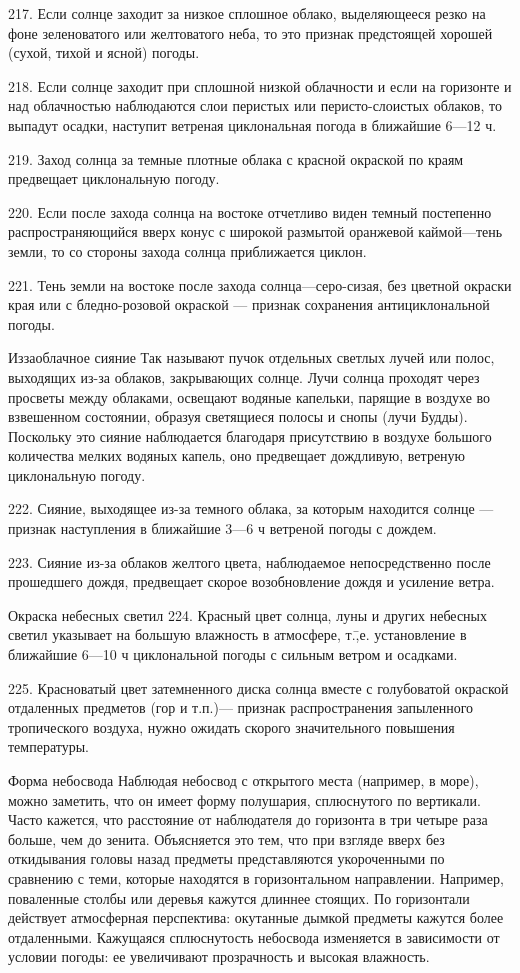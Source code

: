 217. Если солнце заходит за низкое сплошное облако, выделяющееся резко на фоне зеленоватого или желтоватого неба, то это признак предстоящей хорошей (сухой, тихой и ясной) погоды.

218. Если солнце заходит при сплошной низкой облачности и если на горизонте и над облачностью наблюдаются слои перистых или перисто-слоистых облаков, то выпадут осадки, наступит ветреная циклональная погода в ближайшие 6—12 ч.

219. Заход солнца за темные плотные облака с красной окраской по краям предвещает циклональную погоду.

220. Если после захода солнца на востоке отчетливо виден темный постепенно распространяющийся вверх конус с широкой размытой оранжевой каймой—тень земли, то со стороны захода солнца приближается циклон.

221. Тень земли на востоке после захода солнца—серо-сизая, без цветной окраски края или с бледно-розовой окраской — признак сохранения антициклональной погоды.

Иззаоблачное сияние
Так называют пучок отдельных светлых лучей или полос, выходящих из-за облаков, закрывающих солнце. Лучи солнца проходят через просветы между облаками, освещают водяные капельки, парящие в воздухе во взвешенном состоянии, образуя светящиеся полосы и снопы (лучи Будды). Поскольку это сияние наблюдается благодаря присутствию в воздухе большого количества мелких водяных капель, оно предвещает дождливую, ветреную циклональную погоду.

222. Сияние, выходящее из-за темного облака, за которым находится солнце — признак наступления в ближайшие 3—6 ч ветреной погоды с дождем.

223. Сияние из-за облаков желтого цвета, наблюдаемое непосредственно после прошедшего дождя, предвещает скорое возобновление дождя и усиление ветра.

Окраска небесных светил
224. Красный цвет солнца, луны и других небесных светил указывает на большую влажность в атмосфере, т.\=,е. установление в ближайшие 6—10 ч циклональной погоды с сильным ветром и осадками.

225. Красноватый цвет затемненного диска солнца вместе с голубоватой окраской отдаленных предметов (гор и т.п.)— признак распространения запыленного тропического воздуха, нужно ожидать скорого значительного повышения температуры.

Форма небосвода
Наблюдая небосвод с открытого места (например, в море), можно заметить, что он имеет форму полушария, сплюснутого по вертикали. Часто кажется, что расстояние от наблюдателя до горизонта в три четыре раза больше, чем до зенита. Объясняется это тем, что при взгляде вверх без откидывания головы назад предметы представляются укороченными по сравнению с теми, которые находятся в горизонтальном направлении.
Например, поваленные столбы или деревья кажутся длиннее стоящих. По горизонтали действует атмосферная перспектива: окутанные дымкой предметы кажутся более отдаленными. Кажущаяся сплюснутость небосвода изменяется в зависимости от условии погоды: ее увеличивают прозрачность и высокая влажность.

